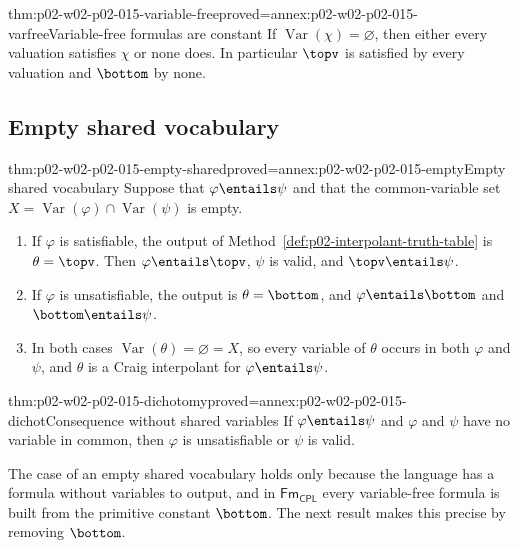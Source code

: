 \begin{hblemma}{thm:p02-w02-p02-015-variable-free}{proved=annex:p02-w02-p02-015-varfree}{Variable-free formulas are constant}
If \(\operatorname{Var}(\chi)=\varnothing\), then either every valuation
satisfies \(\chi\) or none does.  In particular \(\topv\) is satisfied by every
valuation and \(\bottom\) by none.
\end{hblemma}

\subsection{Empty shared vocabulary}
\label{sec:p02-w02-p02-015-empty}

\begin{hbtheorem}{thm:p02-w02-p02-015-empty-shared}{proved=annex:p02-w02-p02-015-empty}{Empty shared vocabulary}
Suppose that \(\varphi\entails\psi\) and that the common-variable set
\(X=\operatorname{Var}(\varphi)\cap\operatorname{Var}(\psi)\) is empty.
\begin{enumerate}
  \item If \(\varphi\) is satisfiable, the output of
        Method~\ref{def:p02-interpolant-truth-table} is
        \(\theta=\topv\).  Then \(\varphi\entails\topv\), \(\psi\) is valid, and
        \(\topv\entails\psi\).
  \item If \(\varphi\) is unsatisfiable, the output is \(\theta=\bottom\), and
        \(\varphi\entails\bottom\) and \(\bottom\entails\psi\).
  \item In both cases \(\operatorname{Var}(\theta)=\varnothing=X\), so every
        variable of \(\theta\) occurs in both \(\varphi\) and \(\psi\), and
        \(\theta\) is a Craig interpolant for \(\varphi\entails\psi\).
\end{enumerate}
\end{hbtheorem}

\begin{hbcorollary}{thm:p02-w02-p02-015-dichotomy}{proved=annex:p02-w02-p02-015-dichot}{Consequence without shared variables}
If \(\varphi\entails\psi\) and \(\varphi\) and \(\psi\) have no variable in
common, then \(\varphi\) is unsatisfiable or \(\psi\) is valid.
\end{hbcorollary}

The case of an empty shared vocabulary holds only because the language has
a formula without variables to output, and in \(\mathsf{Fm}_{\mathsf{CPL}}\) every variable-free formula is built
from the primitive constant \(\bottom\).  The next result makes this precise
by removing \(\bottom\).

